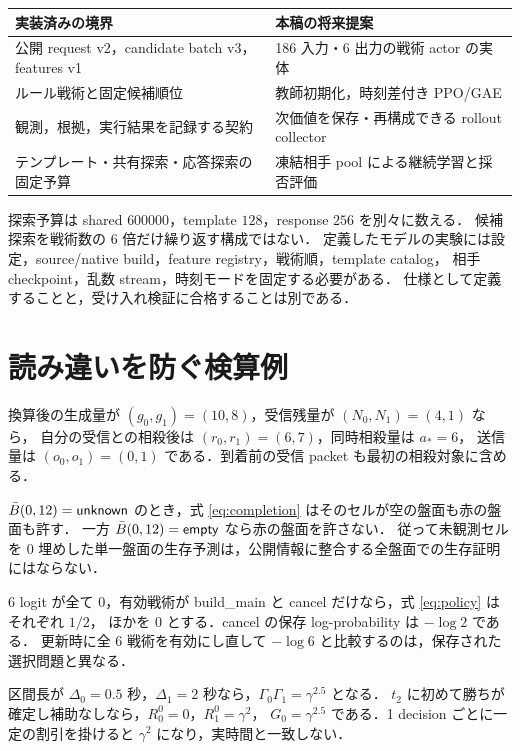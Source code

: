 \begin{center}\begin{tabular}{p{.44\linewidth}p{.47\linewidth}}\toprule 実装済みの境界 & 本稿の将来提案\\\midrule
公開 request v2，candidate batch v3，features v1 & 186 入力・6 出力の戦術 actor の実体\\
ルール戦術と固定候補順位 & 教師初期化，時刻差付き PPO/GAE\\
観測，根拠，実行結果を記録する契約 & 次価値を保存・再構成できる rollout collector\\
テンプレート・共有探索・応答探索の固定予算 & 凍結相手 pool による継続学習と採否評価\\\bottomrule\end{tabular}\end{center}
探索予算は shared $600000$，template $128$，response $256$ を別々に数える．
候補探索を戦術数の $6$ 倍だけ繰り返す構成ではない．
定義したモデルの実験には設定，source/native build，feature registry，戦術順，template catalog，
相手 checkpoint，乱数 stream，時刻モードを固定する必要がある．
仕様として定義することと，受け入れ検証に合格することは別である．

\section{読み違いを防ぐ検算例}\label{sec:examples}
\begin{example}[同時相殺]
換算後の生成量が $(g_0,g_1)=(10,8)$，受信残量が $(N_0,N_1)=(4,1)$ なら，
自分の受信との相殺後は $(r_0,r_1)=(6,7)$，同時相殺量は $a_*=6$，
送信量は $(o_0,o_1)=(0,1)$ である．到着前の受信 packet も最初の相殺対象に含める．
\end{example}
\begin{example}[未観測と空]
$\bar B(0,12)=\mathsf{unknown}$ のとき，式 \eqref{eq:completion} はそのセルが空の盤面も赤の盤面も許す．
一方 $\bar B(0,12)=\mathsf{empty}$ なら赤の盤面を許さない．
従って未観測セルを $0$ 埋めした単一盤面の生存予測は，公開情報に整合する全盤面での生存証明にはならない．
\end{example}
\begin{example}
6 logit が全て $0$，有効戦術が build\_main と cancel だけなら，式 \eqref{eq:policy} はそれぞれ $1/2$，
ほかを $0$ とする．cancel の保存 log-probability は $-\log2$ である．
更新時に全 $6$ 戦術を有効にし直して $-\log6$ と比較するのは，保存された選択問題と異なる．
\end{example}
\begin{example}[可変時間割引]
区間長が $\Delta_0=0.5$ 秒，$\Delta_1=2$ 秒なら，$\Gamma_0\Gamma_1=\gamma^{2.5}$ となる．
$t_2$ に初めて勝ちが確定し補助なしなら，$R_0^0=0$，$R_1^0=\gamma^2$，
$G_0=\gamma^{2.5}$ である．1 decision ごとに一定の割引を掛けると $\gamma^2$ になり，実時間と一致しない．
\end{example}

